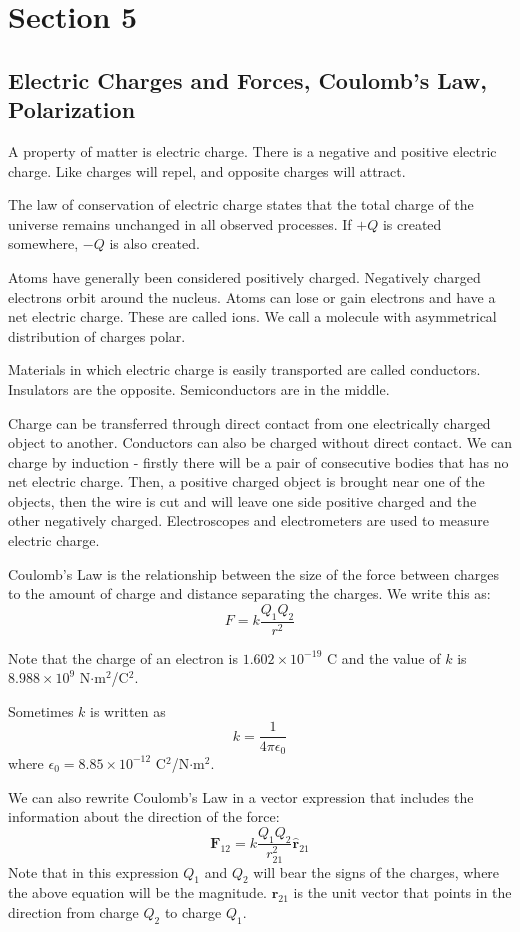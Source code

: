\documentclass[../introphysics.tex]{subfiles}
\begin{document}
\chapter{Section 5}
\section{Electric Charges and Forces, Coulomb's Law, Polarization}
A property of matter is electric charge. There is a negative and positive electric charge. 
Like charges will repel, and opposite charges will attract.

The law of conservation of electric charge states that the total charge of the universe 
remains unchanged in all observed processes. If $+Q$ is created somewhere, $-Q$ is also created.

Atoms have generally been considered positively charged. Negatively charged 
electrons orbit around the nucleus. Atoms can lose or gain electrons and have a net electric charge. 
These are called ions. We call a molecule with asymmetrical distribution of charges polar.

Materials in which electric charge is easily transported are called conductors. 
Insulators are the opposite. Semiconductors are in the middle.

Charge can be transferred through direct contact from one electrically charged object to another. 
Conductors can also be charged without direct contact. We can charge by induction - firstly 
there will be a pair of consecutive bodies that has no net electric charge. Then, a positive 
charged object is brought near one of the objects, then the wire is cut and will leave one side 
positive charged and the other negatively charged. Electroscopes and electrometers are used to measure electric charge.

Coulomb's Law is the relationship between the size of the force between charges to the amount of 
charge and distance separating the charges. We write this as:
\[F=k\frac{Q_1Q_2}{r^2}\]

Note that the charge of an electron is $1.602\times10^{-19}$ C and the value of $k$ is $8.988\times10^9$ N$\cdot$m$^2$/C$^2$. 

Sometimes $k$ is written as
\[k=\frac{1}{4\pi\epsilon_0}\]
where $\epsilon_0 = 8.85\times10^{-12}$ C$^2$/N$\cdot$m$^2$.

We can also rewrite Coulomb's Law in a vector expression that includes the information about the direction of the force:
\[\textbf{F}_{12}=k\frac{Q_1Q_2}{r_{21}^2}\hat{\textbf{r}}_{21}\]
Note that in this expression $Q_1$ and $Q_2$ will bear the signs of the charges, 
where the above equation will be the magnitude. $\hat{\textbf{r}}_{21}$ is the 
unit vector that points in the direction from charge $Q_2$ to charge $Q_1$. 
\end{document}
